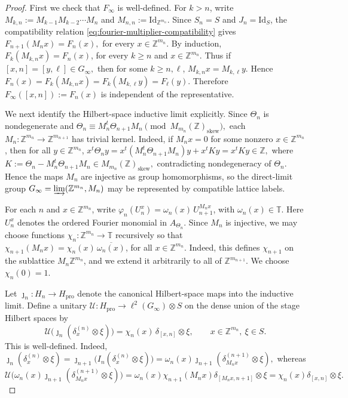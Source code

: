 \documentclass[11pt]{amsart}
\theoremstyle{definition}
\theoremstyle{remark}
\newcommand{\T}{\mathbb{T}}
\newcommand{\Z}{\mathbb{Z}}
\newcommand{\id}{\mathrm{Id}}
\newcommand{\ex}{\mathrm{pro}}
\begin{document}
\begin{proof}
First we check that $F_\infty$ is well-defined. For $k>n$, write $M_{k,n}:=M_{k-1}M_{k-2}\cdots M_n$ and $M_{n,n}:=\id_{\Z^{m_n}}.$
Since $S_n=S$ and $J_n=\id_S$, the compatibility relation
\eqref{eq:fourier-multiplier-compatibility} gives $F_{n+1}(M_nx)=F_n(x),$ for every $x\in\Z^{m_n}$.
By induction, $F_k(M_{k,n}x)=F_n(x)$,
for every $k\geq n$ and $x\in\Z^{m_n}.$
Thus if $[x,n]=[y,\ell]\in G_\infty,$
then for some $k\geq n,\ell$, $M_{k,n}x=M_{k,\ell}y.$
Hence $F_n(x)=F_k(M_{k,n}x)=F_k(M_{k,\ell}y)=F_\ell(y).$
Therefore $F_\infty([x,n]):=F_n(x)$
is independent of the representative.

We next identify the Hilbert-space inductive limit explicitly. Since
$\Theta_n$ is nondegenerate and $\Theta_n\equiv M_n^t\Theta_{n+1}M_n
\pmod{M_{m_n}(\Z)_{\mathrm{skew}}},$
each $M_n\colon\Z^{m_n}\to\Z^{m_{n+1}}$ has trivial kernel. Indeed, if
$M_nx=0$ for some nonzero $x\in\Z^{m_n}$, then for all
$y\in\Z^{m_n}$, $x^t\Theta_n y=x^t(M_n^t\Theta_{n+1}M_n)y+x^tKy=x^tKy\in\Z, $
where $K:=\Theta_n-M_n^t\Theta_{n+1}M_n
\in M_{m_n}(\Z)_{\mathrm{skew}},$
contradicting nondegeneracy of $\Theta_n$. 
Hence the maps $M_n$ are injective as group homomorphisms, so the direct-limit
group $G_\infty=\varinjlim(\Z^{m_n},M_n)$ may be represented by compatible lattice labels.

For each $n$ and $x\in\Z^{m_n}$, write
$\varphi_n(U_n^x)=\omega_n(x)\,U_{n+1}^{M_nx}$, with $\omega_n(x)\in\T.$
Here $U_n^x$ denotes the ordered Fourier monomial in $A_{\Theta_n}$.
Since $M_n$ is injective, we may choose functions $\chi_n\colon\Z^{m_n}\to\T$
recursively so that $\chi_{n+1}(M_nx)=\chi_n(x)\,\overline{\omega_n(x)}$, for all
$x\in\Z^{m_n}.$
Indeed, this defines $\chi_{n+1}$ on the sublattice
$M_n\Z^{m_n}$, and we extend it arbitrarily to all of
$\Z^{m_{n+1}}$. We choose $\chi_n(0)=1$.

Let $\jmath_n\colon H_n\to H_\ex$
denote the canonical Hilbert-space maps into the inductive limit. Define a
unitary $\mathcal U\colon H_\ex\longrightarrow \ell^2(G_\infty)\otimes S$
on the dense union of the stage Hilbert spaces by
\[
\mathcal U\bigl(\jmath_n(\delta_x^{(n)}\otimes\xi)\bigr)
=
\chi_n(x)\,\delta_{[x,n]}\otimes\xi,
\qquad
x\in\Z^{m_n},\ \xi\in S.
\]
This is well-defined. Indeed,
$\jmath_n(\delta_x^{(n)}\otimes\xi)=\jmath_{n+1}\bigl(I_n(\delta_x^{(n)}\otimes\xi)\bigr)
=\omega_n(x)\jmath_{n+1}(\delta_{M_nx}^{(n+1)}\otimes\xi),$ whereas
$\mathcal U\bigl(
\omega_n(x)\jmath_{n+1}(\delta_{M_nx}^{(n+1)}\otimes\xi)
\bigr)
=\omega_n(x)\chi_{n+1}(M_nx)
\delta_{[M_nx,n+1]}\otimes\xi=\chi_n(x)\delta_{[x,n]}\otimes\xi.$


\end{proof}
\end{document}
